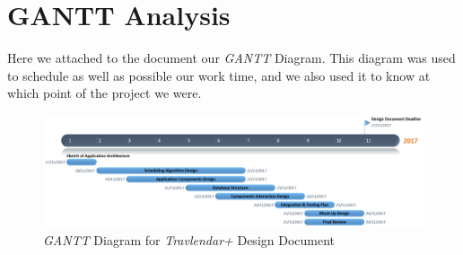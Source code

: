 \section{GANTT Analysis}
Here we attached to the document our \emph{GANTT} Diagram. This diagram was used to schedule as well as possible our work time, and we also used it to know at which point of the project we were.

\begin{figure}[H]
    \centering
    \includegraphics[scale=0.3]{Pictures/GANTT/DD.png}
    \caption{\emph{GANTT} Diagram for \emph{Travlendar+} Design Document}
\end{figure}
